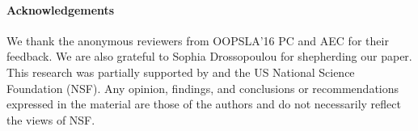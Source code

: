 




\paragraph{Acknowledgements}
We thank the anonymous reviewers from OOPSLA'16 PC and AEC for their feedback. We are also grateful to Sophia Drossopoulou for shepherding our paper. This research was partially supported by  and the US National Science Foundation (NSF). Any opinion, findings, and conclusions or recommendations expressed in the material are those of the authors and do not necessarily reflect the views of NSF.